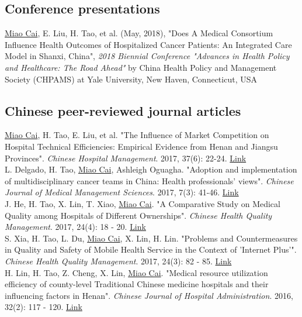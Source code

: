 \documentclass[11pt, a4paper]{article}
\newcommand{\years}[1]{\marginnote{\scriptsize #1}}
\begin{document}
\subsection*{Conference presentations}
\noindent
\years{2018}\underline{Miao Cai}, E. Liu, H. Tao, et al. (May, 2018), "Does A Medical Consortium Influence Health Outcomes of Hospitalized Cancer Patients: An Integrated Care Model in Shanxi, China", \emph{2018 Biennial Conference "Advances in Health Policy and Healthcare: The Road Ahead"} by China Health Policy and Management Society (CHPAMS) at Yale University, New Haven, Connecticut, USA

\subsection*{Chinese peer-reviewed journal articles}
\noindent
\years{2017}\underline{Miao Cai}, H. Tao, E. Liu, et al. "The Influence of Market Competition on Hospital Technical Efficiencies: Empirical Evidence from Henan and Jiangsu Provinces". \emph{Chinese Hospital Management}. 2017, 37(6): 22-24. \href{http://www.cnki.com.cn/Article/CJFDTotal-YYGL201706012.htm}{Link}\\
\years{2017}L. Delgado, H. Tao, \underline{Miao Cai}, Ashleigh Oguagha. "Adoption and implementation of multidisciplinary cancer teams in China: Health professionals’ views". \emph{Chinese Journal of Medical Management Sciences}. 2017, 7(3): 41-46. \href{http://www.cnki.com.cn/Article/CJFDTOTAL-YLGL201703008.htm}{Link}\\
\years{2017}J. He, H. Tao, X. Lin, T. Xiao, \underline{Miao Cai}. "A Comparative Study on Medical Quality among Hospitals of Different Ownerships". \emph{Chinese Health Quality Management}. 2017, 24(4): 18 - 20. \href{http://www.cnki.com.cn/Article/CJFDTOTAL-WSJG201704010.htm}{Link}\\
\years{2017}S. Xia, H. Tao, L. Du, \underline{Miao Cai}, X. Lin, H. Lin. "Problems and Countermeasures in Quality and Safety of Mobile Health Service in the Context of 'Internet Plus'". \emph{Chinese Health Quality Management}. 2017, 24(3): 82 - 85. \href{http://www.cnki.com.cn/Article/CJFDTOTAL-WSJG201703030.htm}{Link}\\
\years{2016}H. Lin, H. Tao, Z. Cheng, X. Lin, \underline{Miao Cai}. "Medical resource utilization efficiency of county-level Traditional Chinese medicine hospitals and their influencing factors in Henan". \emph{Chinese Journal of Hospital Administration}. 2016, 32(2): 117 - 120. \href{http://xuewen.cnki.net/CMFD-1016781136.nh.html}{Link}\\
\end{document}
